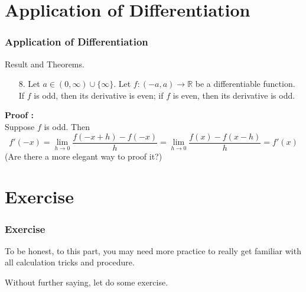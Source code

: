 \documentclass[12pt, t]{beamer}
\begin{document}
\section{Application of Differentiation}
\begin{frame}
    \frametitle{Application of Differentiation}
Result and Theorems.\\
\begin{enumerate}
    \item[8.] Let $a\in(0,\infty)\cup\{\infty\}$. Let $f:(-a,a)\rightarrow\mathbb{R}$ be a differentiable function. 
        If $f$ is odd, then its derivative is even; if $f$ is even, then its derivative is odd. 
\end{enumerate}

\textbf{Proof :}\\
\hspace{1em} Suppose $f$ is odd. Then
\begin{equation*}
    f'(-x)=\underset{h\rightarrow 0}{\lim}\frac{f(-x+h)-f(-x)}{h}=\underset{h\rightarrow 0}{\lim}\frac{f(x)-f(x-h)}{h}=f'(x)
\end{equation*} 
(Are there a more elegant way to proof it?)
\end{frame}

\section{Exercise}
\begin{frame}
    \frametitle{Exercise}
To be honest, to this part, you may need more practice to really get familiar with all calculation tricks and procedure. \\
\vspace{4em}
\begin{center}
    \Large Without further saying, let do some exercise.
\end{center}

\end{frame}
\end{document}
